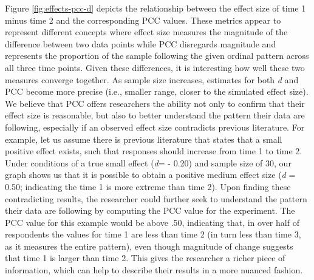 \documentclass[,man, mask]{apa6}
\theoremstyle{definition}
\theoremstyle{definition}
\theoremstyle{definition}
\theoremstyle{remark}
\begin{document}
Figure \ref{fig:effects-pcc-d} depicts the relationship between the
effect size of time 1 minus time 2 and the corresponding PCC values.
These metrics appear to represent different concepts where effect size
measures the magnitude of the difference between two data points while
PCC disregards magnitude and represents the proportion of the sample
following the given ordinal pattern across all three time points. Given
these differences, it is interesting how well these two measures
converge together. As sample size increases, estimates for both \emph{d}
and PCC become more precise (i.e., smaller range, closer to the
simulated effect size). We believe that PCC offers researchers the
ability not only to confirm that their effect size is reasonable, but
also to better understand the pattern their data are following,
especially if an observed effect size contradicts previous literature.
For example, let us assume there is previous literature that states that
a small positive effect exists, such that responses should increase from
time 1 to time 2. Under conditions of a true small effect (\emph{d}= -
0.20) and sample size of 30, our graph shows us that it is possible to
obtain a positive medium effect size (\emph{d} = 0.50; indicating the
time 1 is more extreme than time 2). Upon finding these contradicting
results, the researcher could further seek to understand the pattern
their data are following by computing the PCC value for the experiment.
The PCC value for this example would be above .50, indicating that, in
over half of respondents the values for time 1 are less than time 2 (in
turn less than time 3, as it measures the entire pattern), even though
magnitude of change suggests that time 1 is larger than time 2. This
gives the researcher a richer piece of information, which can help to
describe their results in a more nuanced fashion.
\end{document}
